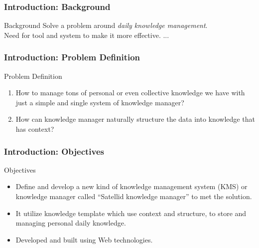 \documentclass[10pt, compress]{beamer}
\begin{document}

\begin{frame}[fragile]
  \frametitle{Introduction: Background}

  \begin{block}{Background}
    Solve a problem around \alert{\emph{daily knowledge management}}.\\
    Need for tool and system to make it more effective.
    ...
  \end{block}

\end{frame}


\begin{frame}[fragile]
  \frametitle{Introduction: Problem Definition}

  \begin{block}{Problem Definition}
    \begin{enumerate}
      \item How to manage tons of personal or even collective knowledge we have with just a simple and single system of knowledge manager?
      \item How can knowledge manager naturally structure the data into knowledge that has context?
    \end{enumerate}
  \end{block}

\end{frame}


\begin{frame}[fragile]
  \frametitle{Introduction: Objectives}

  \begin{block}{Objectives}
    \begin{itemize} \itemsep0pt
      \item Define and develop a new kind of knowledge management system (KMS) or knowledge manager called \alert{``Satellid knowledge manager''} to met the solution.
      \item It utilize knowledge template which use context and structure, to store and managing personal daily knowledge.
      \item Developed and built using Web technologies.
    \end{itemize}
  \end{block}

\end{frame}
\end{document}
